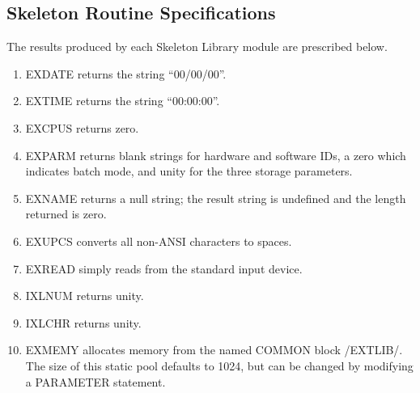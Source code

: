 \subsection{Skeleton Routine Specifications}
The results produced by each Skeleton Library module are prescribed below.
\begin{enumerate}
\item EXDATE returns the string ``00/00/00''.

\item EXTIME returns the string ``00:00:00''.

\item EXCPUS returns zero.

\item EXPARM returns blank strings for hardware and software IDs, a zero which
indicates batch mode, and unity for the three storage parameters.

\item EXNAME returns a null string; the result string is undefined and the
   length returned is zero.

\item EXUPCS converts all non-ANSI characters to spaces.

\item EXREAD simply reads from the standard input device.

\item IXLNUM returns unity.

\item IXLCHR returns unity.

\item EXMEMY allocates memory from the named COMMON block /EXTLIB/.  The size
   of this static pool defaults to 1024, but can be changed by modifying a
   PARAMETER statement.
\end{enumerate}
